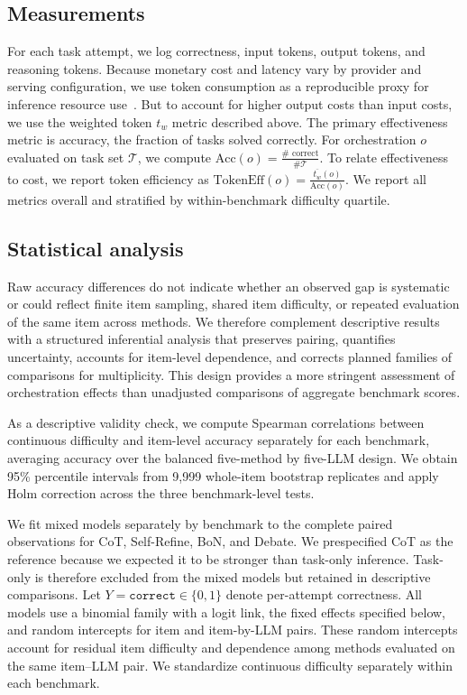 \documentclass[a4paper]{article}
\theoremstyle{plain}
\theoremstyle{definition}
\theoremstyle{remark}
\begin{document}
\subsection{Measurements}
For each task attempt, we log correctness, input tokens, output tokens, and reasoning tokens.
Because monetary cost and latency vary by provider and serving configuration, we use token consumption as a reproducible proxy for inference resource use~\citep{du_ockbench_2026,huan_scaling_2025}. But to account for higher output costs than input costs, we use the weighted token $t_w$ metric described above.
The primary effectiveness metric is accuracy, the fraction of tasks solved correctly.
For orchestration $o$ evaluated on task set $\mathcal{T}$, we compute $\mathrm{Acc}(o)=\frac{\#\text{ correct}}{\#\mathcal{T}}$.
To relate effectiveness to cost, we report token efficiency as $\mathrm{TokenEff}(o)=\frac{\overline{t_w}(o)}{\mathrm{Acc}(o)}$.
We report all metrics overall and stratified by within-benchmark difficulty quartile.

\subsection{Statistical analysis}
Raw accuracy differences do not indicate whether an observed gap is systematic or could reflect finite item sampling, shared item difficulty, or repeated evaluation of the same item across methods.
We therefore complement descriptive results with a structured inferential analysis that preserves pairing, quantifies uncertainty, accounts for item-level dependence, and corrects planned families of comparisons for multiplicity.
This design provides a more stringent assessment of orchestration effects than unadjusted comparisons of aggregate benchmark scores.

As a descriptive validity check, we compute Spearman correlations between continuous difficulty and item-level accuracy separately for each benchmark, averaging accuracy over the balanced five-method by five-LLM design.
We obtain 95\% percentile intervals from 9,999 whole-item bootstrap replicates and apply Holm correction across the three benchmark-level tests.

We fit mixed models separately by benchmark to the complete paired observations for CoT, Self-Refine, BoN, and Debate.
We prespecified CoT as the reference because we expected it to be stronger than task-only inference.
Task-only is therefore excluded from the mixed models but retained in descriptive comparisons.
Let $Y=\texttt{correct}\in\{0,1\}$ denote per-attempt correctness.
All models use a binomial family with a logit link, the fixed effects specified below, and random intercepts for item and item-by-LLM pairs.
These random intercepts account for residual item difficulty and dependence among methods evaluated on the same item--LLM pair.
We standardize continuous difficulty separately within each benchmark.
\end{document}
